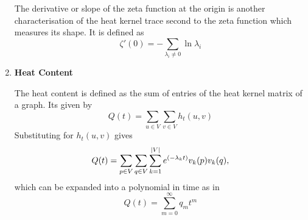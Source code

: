 \documentclass[10pt,a4paper]{article}
\begin{document}
\begin{enumerate}[1]
        	The derivative or slope of the zeta function at the origin is another characterisation of the heat kernel trace second to the zeta function which measures its shape. It is defined as
        	\begin{equation}
	        \zeta'(0) = -\sum_{\lambda_i \neq 0}\ln \lambda_i
        	\end{equation}
        	\item \textbf{Heat Content}
        	
        	The heat content is defined as the sum of entries of the heat kernel matrix of a graph. Its given by
        	\begin{equation}
        	Q(t) = \sum_{u \in V} \sum_{v \in V} h_{t}(u,v)
        	\end{equation}
        	Substituting for $h_t(u,v)$ gives
        	\begin{equation}
        	Q(t) = \sum_{p \in V} \sum_{q \in V} \sum_{k=1}^{\arrowvert V\arrowvert} e^{(-\lambda_{k} t)} v_{k}(p) v_{k}(q),
        	\end{equation}
        	which can be expanded into a polynomial in time as in \citep{mcdonald2002diffusions}
        	\begin{equation}
        	Q(t) = \sum_{m=0}^{\infty} q_m t^m
        	\end{equation}
        \end{enumerate}
    
        
	  
\end{document}
